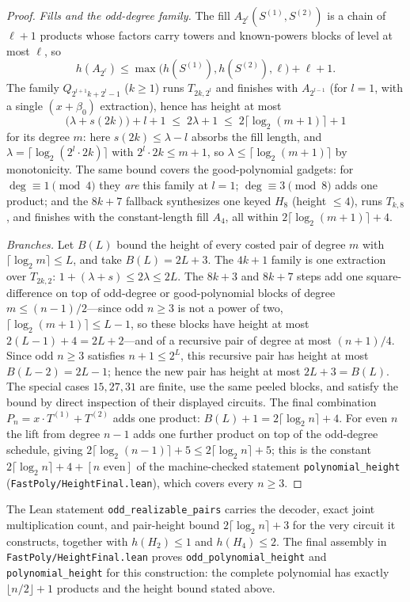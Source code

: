 \begin{proof}
\emph{Fills and the odd-degree family.}  The fill
$A_{2^\ell}(S^{(1)},S^{(2)})$ is a chain of $\ell+1$ products whose factors
carry towers and known-powers blocks of level at most $\ell$, so
\[
  h(A_{2^\ell})\le\max\bigl(h(S^{(1)}),h(S^{(2)}),\ell\bigr)+\ell+1.
\]
The
family $Q_{2^{l+1}k+2^l-1}$ ($k\ge1$) runs $T_{2k,2^l}$ and finishes with
$A_{2^{l-1}}$ (for $l=1$, with a single $(x+\beta_0)$ extraction), hence
has height at most
\[
  \bigl(\lambda+s(2k)\bigr)+l+1
  \;\le\;
  2\lambda+1
  \;\le\;
  2\lceil\log_2(m+1)\rceil+1
\]
for its degree $m$: here $s(2k)\le\lambda-l$ absorbs the fill length, and
$\lambda=\lceil\log_2(2^l\cdot 2k)\rceil$ with $2^l\cdot2k\le m+1$,
so $\lambda\le\lceil\log_2(m+1)\rceil$ by monotonicity.  The same bound covers the
good-polynomial gadgets: for $\deg\equiv1\pmod4$ they \emph{are} this
family at $l=1$; $\deg\equiv3\pmod8$ adds one product; and the
$8k+7$ fallback synthesizes one keyed $H_8$ (height $\le4$), runs
$T_{k,8}$, and finishes with the constant-length fill $A_4$, all within
$2\lceil\log_2(m+1)\rceil+4$.

\emph{Branches.}  Let $B(L)$ bound the height of every costed pair of
degree $m$ with $\lceil\log_2m\rceil\le L$, and take
$B(L)=2L+3$.  The $4k+1$ family is one extraction over $T_{2k,2}$:
$1+(\lambda+s)\le2\lambda\le2L$.  The $8k+3$ and $8k+7$ steps add one
square-difference on top of odd-degree or good-polynomial blocks of degree
$m\le(n-1)/2$---since odd $n\ge3$ is not a power of two,
$\lceil\log_2(m+1)\rceil\le L-1$, so these blocks have height at most
$2(L-1)+4=2L+2$---and of a recursive pair of degree at most $(n+1)/4$.
Since odd $n\ge3$ satisfies $n+1\le2^L$, this recursive pair has height
at most $B(L-2)=2L-1$; hence the new pair has height at most
$2L+3=B(L)$.  The special cases $15,27,31$ are finite, use the same peeled
blocks, and satisfy the bound by direct inspection of their displayed
circuits.  The final combination
$P_n=x\cdot T^{(1)}+T^{(2)}$ adds one product:
$B(L)+1=2\lceil\log_2n\rceil+4$.  For even $n$ the lift from degree
$n-1$ adds one further product on top of the odd-degree schedule, giving
$2\lceil\log_2(n-1)\rceil+5\le2\lceil\log_2n\rceil+5$; this is the
constant $2\lceil\log_2 n\rceil+4+[n\text{ even}]$ of the machine-checked
statement \texttt{polynomial\_height} (\texttt{FastPoly/HeightFinal.lean}),
which covers every $n\ge3$.
\end{proof}


\begin{remark}
The Lean statement \texttt{odd\_realizable\_pairs} carries the decoder,
exact joint multiplication count, and pair-height bound
$2\lceil\log_2n\rceil+3$ for the very circuit it constructs, together
with $h(H_2)\le1$ and $h(H_4)\le2$.
The final assembly in \texttt{FastPoly/HeightFinal.lean} proves
\texttt{odd\_polynomial\_height} and \texttt{polynomial\_height} for
this construction: the complete polynomial has exactly
$\lfloor n/2\rfloor+1$ products and the height bound stated above.
\end{remark}
